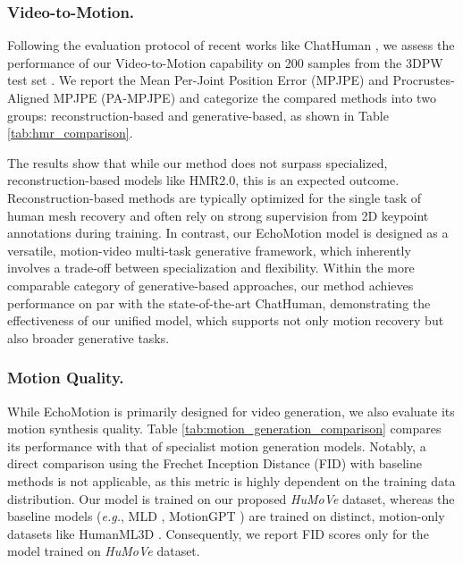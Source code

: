 {\subsubsection{Video-to-Motion.}
\label{sec:v2m_quantitative}

Following the evaluation protocol of recent works like ChatHuman \citep{chathuman}, we assess the performance of our Video-to-Motion capability on 200 samples from the 3DPW test set \citep{von2018recovering}. We report the Mean Per-Joint Position Error (MPJPE) and Procrustes-Aligned MPJPE (PA-MPJPE) and categorize the compared methods into two groups: reconstruction-based and generative-based, as shown in Table \ref{tab:hmr_comparison}.

The results show that while our method does not surpass specialized, reconstruction-based models like HMR2.0\cite{hmr2}, this is an expected outcome. Reconstruction-based methods are typically optimized for the single task of human mesh recovery and often rely on strong supervision from 2D keypoint annotations during training. In contrast, our EchoMotion model is designed as a versatile, motion-video multi-task generative framework, which inherently involves a trade-off between specialization and flexibility. Within the more comparable category of generative-based approaches, our method achieves performance on par with the state-of-the-art ChatHuman, demonstrating the effectiveness of our unified model, which supports not only motion recovery but also broader generative tasks.






\subsubsection{Motion Quality.}


While EchoMotion is primarily designed for video generation, we also evaluate its motion synthesis quality. Table \ref{tab:motion_generation_comparison} compares its performance with that of specialist motion generation models.
Notably, a direct comparison using the Frechet Inception Distance (FID) with baseline methods is not applicable, as this metric is highly dependent on the training data distribution. Our model is trained on our proposed \textit{HuMoVe} dataset, whereas the baseline models (\textit{e.g.}, MLD \citep{mld}, MotionGPT \citep{motiongpt}) are trained on distinct, motion-only datasets like HumanML3D \citep{guo2022generating}. Consequently, we report FID scores only for the model trained on \textit{HuMoVe} dataset.

}
